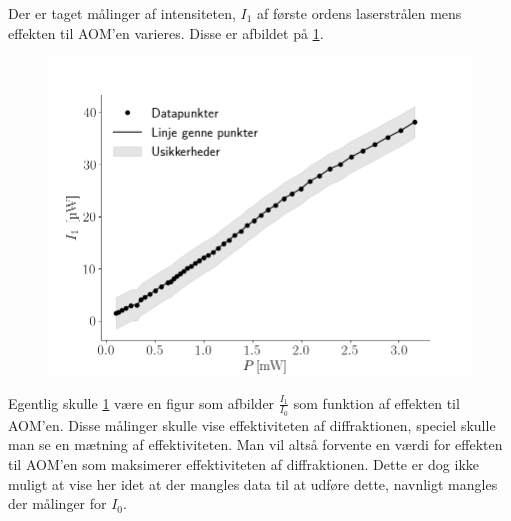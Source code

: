 \documentclass[main]{subfiles}
\begin{document}
\bigskip

Der er taget målinger af intensiteten, $I_1$ af første ordens laserstrålen mens effekten til AOM'en varieres. Disse er afbildet på \cref{fig:graf2}.

\begin{figure}[H]
    \centering
    \includegraphics[width=\linewidth]{tegninger/graf2.png}
    \caption{}
    \label{fig:graf2}
\end{figure}
Egentlig skulle \cref{fig:graf2} være en figur som afbilder $\frac{I_1}{I_0}$ som funktion af effekten til AOM'en. Disse målinger skulle vise effektiviteten af diffraktionen, speciel skulle man se en mætning af effektiviteten. Man vil altså forvente en værdi for effekten til AOM'en som maksimerer effektiviteten af diffraktionen. Dette er dog ikke muligt at vise her idet at der mangles data til at udføre dette, navnligt mangles der målinger for $I_0$.  
\end{document}
